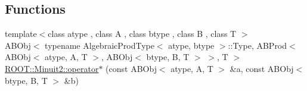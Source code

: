 \subsection*{Functions}
\begin{DoxyCompactItemize}
\item 
{\footnotesize template$<$class atype , class A , class btype , class B , class T $>$ }\\A\+B\+Obj$<$ typename Algebraic\+Prod\+Type$<$ atype, btype $>$\+::Type, A\+B\+Prod$<$ A\+B\+Obj$<$ atype, A, T $>$, A\+B\+Obj$<$ btype, B, T $>$ $>$, T $>$ \mbox{\hyperlink{namespaceROOT_1_1Minuit2_a4f2bdc9b3267afa787ef956ac703f344}{R\+O\+O\+T\+::\+Minuit2\+::operator$\ast$}} (const A\+B\+Obj$<$ atype, A, T $>$ \&a, const A\+B\+Obj$<$ btype, B, T $>$ \&b)
\end{DoxyCompactItemize}
